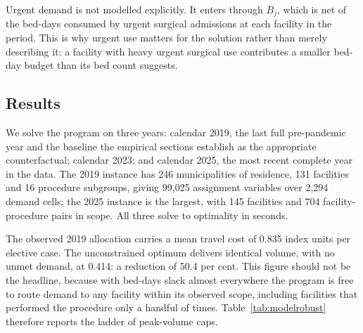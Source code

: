 Urgent demand is not modelled explicitly. It enters through $B_j$, which is net
of the bed-days consumed by urgent surgical admissions at each facility in the
period. This is why urgent use matters for the solution rather than merely describing it: a facility with heavy urgent surgical use contributes a smaller bed-day budget than its bed count suggests.

\subsection{Results}
\label{sec:modelresults}

We solve the program on three years: calendar 2019, the last full pre-pandemic
year and the baseline the empirical sections establish as the appropriate
counterfactual; calendar 2023; and calendar 2025, the most recent complete year
in the data. The 2019 instance has 246 municipalities of residence, 131
facilities and 16 procedure subgroups, giving 99{,}025 assignment variables over
2{,}294 demand cells; the 2025 instance is the largest, with 145 facilities and
704 facility-procedure pairs in scope. All three solve to optimality in
seconds.

The observed 2019 allocation carries a mean travel cost of 0.835
index units per elective case. The unconstrained optimum delivers identical
volume, with no unmet demand, at 0.414: a reduction of 50.4 per cent. This
figure should not be the headline, because with bed-days slack almost everywhere
the program is free to route demand to any facility within its observed scope,
including facilities that performed the procedure only a handful of times.
Table~\ref{tab:modelrobust} therefore reports the ladder of peak-volume caps.

